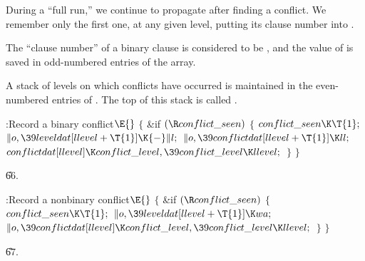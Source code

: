 During a ``full run,'' we continue to propagate after
finding a conflict.
We remember only the first one, at any given level,
putting its clause number into .

The ``clause number'' of a binary clause is
considered to be , and the value of  is saved
in odd-numbered entries of the  array.

A stack of levels on which conflicts have occurred is maintained
in the even-numbered entries of . The top of this
stack is called .

\Y\B\4:Record a binary conflict\X${}\E{}$\6
${}\{{}$\1\6
\&{if} ${}(\R\\{conflict\_seen}){}$\5
${}\{{}$\1\6
${}\\{conflict\_seen}\K\T{1};{}$\6
${}\|o,\39\\{leveldat}[\\{llevel}+\T{1}]\K{-}\|l;{}$\6
${}\|o,\39\\{conflictdat}[\\{llevel}+\T{1}]\K\\{ll};{}$\6
${}\\{conflictdat}[\\{llevel}]\K\\{conflict\_level},\39\\{conflict\_level}\K%
\\{llevel};{}$\6
\4${}\}{}$\2\6
\4${}\}{}$\2\par
\U66.\fi

\B{}:Record a nonbinary conflict\X${}\E{}$\6
${}\{{}$\1\6
\&{if} ${}(\R\\{conflict\_seen}){}$\5
${}\{{}$\1\6
${}\\{conflict\_seen}\K\T{1};{}$\6
${}\|o,\39\\{leveldat}[\\{llevel}+\T{1}]\K\\{wa};{}$\6
${}\|o,\39\\{conflictdat}[\\{llevel}]\K\\{conflict\_level},\39\\{conflict%
\_level}\K\\{llevel};{}$\6
\4${}\}{}$\2\6
\4${}\}{}$\2\par
\U67.\fi

